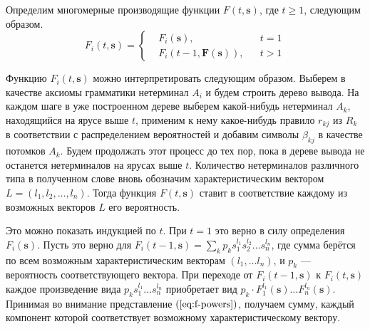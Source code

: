 \documentclass[12pt]{article}
\renewcommand{\geq}{\geqslant}
\begin{document}
Определим многомерные производящие функции $F(t, \mathbf{s})$, где $t \geq 1$, следующим образом.
\begin{equation*}
	F_i(t, \mathbf{s}) = \left\{
	\begin{split}
		&F_i(\mathbf{s}), & &t = 1 \\
		&F_i(t-1, \mathbf{F}(\mathbf{s})), & &t > 1
	\end{split}
	\right.
\end{equation*}

Функцию $F_i(t, \mathbf{s})$ можно интерпретировать следующим образом. Выберем в качестве аксиомы грамматики нетерминал $A_i$ и будем строить дерево вывода. На каждом шаге в уже построенном дереве выберем какой-нибудь нетерминал $A_k$, находящийся на ярусе выше $t$, применим к нему какое-нибудь правило $r_{kj}$ из $R_k$ в соответствии с распределением вероятностей и добавим символы $\beta_{kj}$ в качестве потомков $A_k$. Будем продолжать этот процесс до тех пор, пока в дереве вывода не останется нетерминалов на ярусах выше $t$. Количество нетерминалов различного типа в полученном слове вновь обозначим характеристическим вектором $L = (l_1, l_2, \ldots, l_n)$. Тогда функция $F(t, \mathbf{s})$ ставит в соответствие каждому из возможных векторов $L$ его вероятность.

Это можно показать индукцией по $t$. При $t = 1$ это верно в силу определения $F_i(\mathbf{s})$. Пусть это верно для $F_i(t-1, \mathbf{s}) = \sum_k p_k s_1^{l_1} s_2^{l_2} \ldots s_n^{l_n}$, где сумма берётся по всем возможным характеристическим векторам $(l_1, \ldots l_n)$, и $p_k$ --- вероятность соответствующего вектора. При переходе от $F_i(t-1, \mathbf{s})$ к $F_i(t, \mathbf{s})$ каждое произведение вида $p_k s_1^{l_1} \ldots s_n^{l_n}$ приобретает вид $p_k \cdot F_1^{l_1}(\mathbf{s}) \ldots F_n^{l_n}(\mathbf{s})$. Принимая во внимание представление $(\ref{eq:f-powers})$, получаем сумму, каждый компонент которой соответствует возможному характеристическому вектору.
\end{document}
